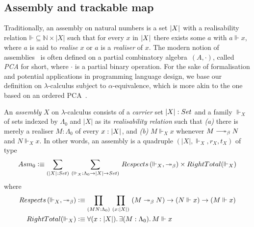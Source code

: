 \documentclass[draft,a4paper,UKenglish,numberwithinsect,cleveref,thm-restate]{lipics-v2021}
\numberwithin{equation}{section}
\theoremstyle{definition}
\theoremstyle{plain}
\begin{document}
\subsection{Assembly and trackable map}
Traditionally, an assembly on natural numbers is a set $\mathopen{}\left|X\right|_{}^{}\mathclose{}$ with a realisability relation $\mathord{\Vdash} \subseteq \mathbb{N} \times |X|$ such that for every $x$ in $\mathopen{}\left|X\right|_{}^{}\mathclose{}$ there exists some $a$ with $a \Vdash x$, where $a$ is said to \emph{realise} $x$ or $a$ is a \emph{realiser} of $x$.
The modern notion of assemblies~\cite{Oosten2008} is often defined on a partial  combinatory algebra~$(A, \cdot)$, called \emph{PCA} for short, where $\cdot$ is a partial binary operation.
For the sake of formalisation and potential applications in programming language design, we base our definition on $\lambda$-calculus subject to $\alpha$-equivalence, which is more akin to the one based on an ordered PCA~\cite{Hofstra2003}. 

\begin{definition}\label{def:assembly}
  An \emph{assembly} $X$ on $\lambda$-calculus consists of a \emph{carrier} set $|X| : \set$ and a family ${\Vdash_X}$ of sets indexed by $\Lambda_0$ and $|X|$ as its \emph{realisability relation} such that
  \emph{(a)} there is merely a realiser $M : \Lambda_0$ of every $x : \mathopen{}\left|X\right|_{}^{}\mathclose{}$, and
  \emph{(b)} $M \Vdash_X x$ whenever $M \reduce N$ and $N \Vdash_X x$.
  In other words, an assembly is a quadruple $(|X|, \Vdash_X, r_X, t_X)$ of type
  \[
    \Asm_0 \defeq \sm{\bproj{X} : {\set}}{\mathord{\Vdash_X}:\Lambda_0 \to |X| \to \set} 
      \mathsf{Respects}\left(\Vdash_X, \mathord{\twoheadrightarrow_\beta}\right)
      \times \mathsf{RightTotal}({\Vdash_X})
  \]
  where
  \begin{align}
    \mathsf{Respects}\left(\mathord{\Vdash_X}, \mathord{\twoheadrightarrow_\beta}\right) & \defeq\prd{M N : \Lambda_0}{x : |X|} \left(M \twoheadrightarrow_ \beta N\right) \to \left(N \Vdash x\right) \to \left(M \Vdash x\right) \label{eq:respect-reduction} \\      
    \mathsf{RightTotal}(\Vdash_X) & \defeq \fall{x : |X|}\exis{M : \Lambda_0} M \Vdash x
    \label{eq:right-total}
  \end{align}
\end{definition}
\end{document}
